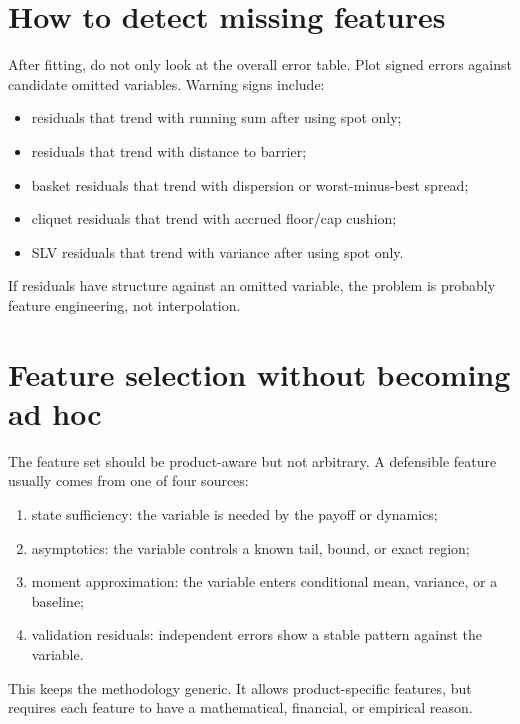 \documentclass[11pt,oneside]{book}
\theoremstyle{definition}
\begin{document}
\section{How to detect missing features}
After fitting, do not only look at the overall error table. Plot signed errors
against candidate omitted variables. Warning signs include:
\begin{itemize}
  \item residuals that trend with running sum after using spot only;
  \item residuals that trend with distance to barrier;
  \item basket residuals that trend with dispersion or worst-minus-best spread;
  \item cliquet residuals that trend with accrued floor/cap cushion;
  \item SLV residuals that trend with variance after using spot only.
\end{itemize}
If residuals have structure against an omitted variable, the problem is
probably feature engineering, not interpolation.

\section{Feature selection without becoming ad hoc}
The feature set should be product-aware but not arbitrary. A defensible feature
usually comes from one of four sources:
\begin{enumerate}
  \item state sufficiency: the variable is needed by the payoff or dynamics;
  \item asymptotics: the variable controls a known tail, bound, or exact region;
  \item moment approximation: the variable enters conditional mean, variance, or
        a baseline;
  \item validation residuals: independent errors show a stable pattern against
        the variable.
\end{enumerate}
This keeps the methodology generic. It allows product-specific features, but
requires each feature to have a mathematical, financial, or empirical reason.
\end{document}

